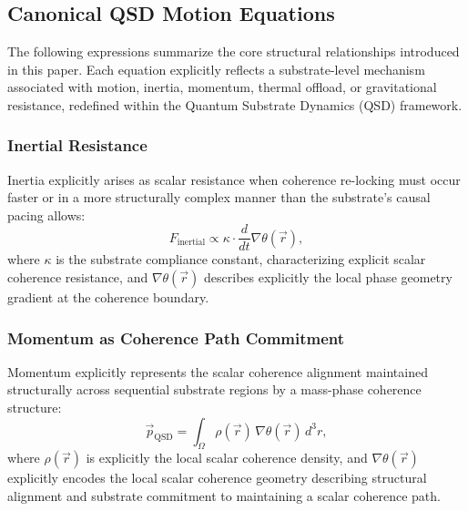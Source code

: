 \documentclass[preprints,article,submit,pdftex,moreauthors]{Definitions/mdpi}
\begin{document}
\section[\appendixname~\thesection]{}
\subsection[\appendixname~\thesubsection]{Canonical QSD Motion Equations}
The following expressions summarize the core structural relationships introduced in this paper. Each equation explicitly reflects a substrate-level mechanism associated with motion, inertia, momentum, thermal offload, or gravitational resistance, redefined within the Quantum Substrate Dynamics (QSD) framework.

\subsubsection{Inertial Resistance}
Inertia explicitly arises as scalar resistance when coherence re-locking must occur faster or in a more structurally complex manner than the substrate’s causal pacing allows:
\begin{equation}
    F_{\text{inertial}} \propto \kappa \cdot \frac{d}{dt} \nabla \theta(\vec{r}),
\end{equation}
where \(\kappa\) is the substrate compliance constant, characterizing explicit scalar coherence resistance, and \(\nabla \theta(\vec{r})\) describes explicitly the local phase geometry gradient at the coherence boundary.

\subsubsection{Momentum as Coherence Path Commitment}
Momentum explicitly represents the scalar coherence alignment maintained structurally across sequential substrate regions by a mass-phase coherence structure:
\begin{equation}
    \vec{p}_{\text{QSD}} = \int_{\Omega} \rho(\vec{r}) \, \nabla \theta(\vec{r}) \, d^3r,
\end{equation}
where \(\rho(\vec{r})\) is explicitly the local scalar coherence density, and \(\nabla \theta(\vec{r})\) explicitly encodes the local scalar coherence geometry describing structural alignment and substrate commitment to maintaining a scalar coherence path.
\end{document}
